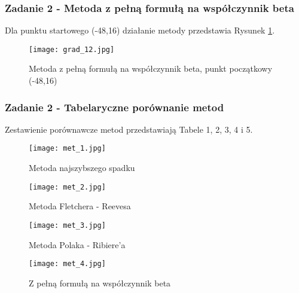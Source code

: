 \documentclass[a4paper,15pt]{article}
\begin{document}
\subsubsection{Zadanie 2 - Metoda z pełną formułą na współczynnik beta }
Dla punktu startowego (-48,16) działanie metody przedstawia Rysunek \ref{fig:grad_12}.
\begin{figure}[H]
\centerline{\texttt{[image: grad\_12.jpg]}}
\centering
\caption{Metoda z pełną formułą na współczynnik beta, punkt początkowy (-48,16) }
\label{fig:grad_12}
\end{figure}
\subsubsection{Zadanie 2 - Tabelaryczne porównanie metod}
Zestawienie porównawcze metod przedstawiają Tabele 1, 2, 3, 4 i 5.  

\begin{figure}[H]
\centerline{\texttt{[image: met\_1.jpg]}}
\centering
\caption{Metoda najszybszego spadku }
\label{fig:met_1}
\end{figure}

\begin{figure}[H]
\centerline{\texttt{[image: met\_2.jpg]}}
\centering
\caption{Metoda Fletchera - Reevesa }
\label{fig:met_2}
\end{figure}

\begin{figure}[H]
\centerline{\texttt{[image: met\_3.jpg]}}
\centering
\caption{Metoda Polaka - Ribiere'a }
\label{fig:met_3}
\end{figure}

\begin{figure}[H]
\centerline{\texttt{[image: met\_4.jpg]}}
\centering
\caption{Z pełną formułą na współczynnik beta }
\label{fig:met_4}
\end{figure}
\end{document}

